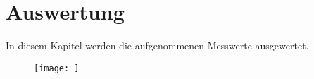 


\section{Auswertung}
\label{sec:auswertung}

In diesem Kapitel werden die aufgenommenen Messwerte ausgewertet.
\begin{figure}
  \centering
  \texttt{[image: ]}
  \caption{}
  \label{fig:}
\end{figure}
  